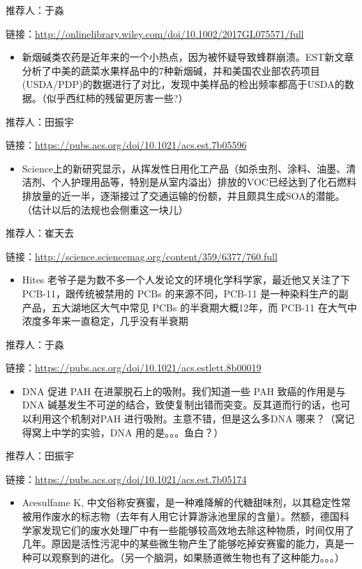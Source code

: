 \documentclass[
]{book}
\providecommand{\tightlist}{%
  \setlength{\itemsep}{0pt}\setlength{\parskip}{0pt}}
\begin{document}
推荐人：于淼

链接：\url{http://onlinelibrary.wiley.com/doi/10.1002/2017GL075571/full}

\begin{itemize}
\tightlist
\item
  新烟碱类农药是近年来的一个小热点，因为被怀疑导致蜂群崩溃。EST新文章分析了中美的蔬菜水果样品中的7种新烟碱，并和美国农业部农药项目(USDA/PDP)的数据进行了对比，发现中美样品的检出频率都高于USDA的数据。（似乎西红柿的残留更厉害一些?）
\end{itemize}

推荐人：田振宇

链接：\url{https://pubs.acs.org/doi/10.1021/acs.est.7b05596}

\begin{itemize}
\tightlist
\item
  Science上的新研究显示，从挥发性日用化工产品（如杀虫剂、涂料、油墨、清洁剂、个人护理用品等，特别是从室内溢出）排放的VOC已经达到了化石燃料排放量的近一半，逐渐接过了交通运输的份额，并且颇具生成SOA的潜能。（估计以后的法规也会侧重这一块儿）
\end{itemize}

推荐人：崔天去

链接：\url{http://science.sciencemag.org/content/359/6377/760.full}

\begin{itemize}
\tightlist
\item
  Hites 老爷子是为数不多一个人发论文的环境化学科学家，最近他又关注了下 PCB-11，跟传统被禁用的 PCBs 的来源不同，PCB-11 是一种染料生产的副产品，五大湖地区大气中常见 PCBs 的半衰期大概12年，而 PCB-11 在大气中浓度多年来一直稳定，几乎没有半衰期
\end{itemize}

推荐人：于淼

链接：\url{https://pubs.acs.org/doi/10.1021/acs.estlett.8b00019}

\begin{itemize}
\tightlist
\item
  DNA 促进 PAH 在进蒙脱石上的吸附。我们知道一些 PAH 致癌的作用是与DNA 碱基发生不可逆的结合，致使复制出错而突变。反其道而行的话，也可以利用这个机制对PAH 进行吸附。主意不错，但是这么多DNA 哪来？（窝记得窝上中学的实验，DNA 用的是。。。鱼白？）
\end{itemize}

推荐人：田振宇

链接：\url{https://pubs.acs.org/doi/10.1021/acs.est.7b05174}

\begin{itemize}
\tightlist
\item
  Acesulfame K, 中文俗称安赛蜜，是一种难降解的代糖甜味剂，以其稳定性常被用作废水的标志物（去年有人用它计算游泳池里尿的含量）。然额，德国科学家发现它们的废水处理厂中有一些能够较高效地去除这种物质，时间仅用了几年。原因是活性污泥中的某些微生物产生了能够吃掉安赛蜜的能力，真是一种可以观察到的进化。（另一个脑洞，如果肠道微生物也有了这种能力。。。）
\end{itemize}
\end{document}
